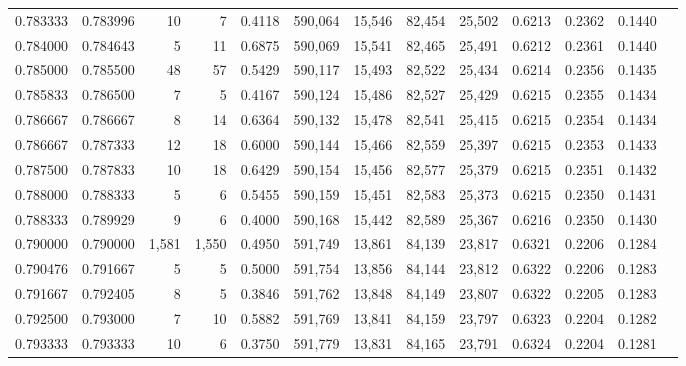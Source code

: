 \begin{tabular}{rrrrrrrrrrrrr}
0.783333 & 0.783996 &     10 &     7 &                                     0.4118 & 590,064 &  15,546 &  82,454 &  25,502 & 0.6213 & 0.2362 & 0.1440 \\
0.784000 & 0.784643 &      5 &    11 &                                     0.6875 & 590,069 &  15,541 &  82,465 &  25,491 & 0.6212 & 0.2361 & 0.1440 \\
0.785000 & 0.785500 &     48 &    57 &                                     0.5429 & 590,117 &  15,493 &  82,522 &  25,434 & 0.6214 & 0.2356 & 0.1435 \\
0.785833 & 0.786500 &      7 &     5 &                                     0.4167 & 590,124 &  15,486 &  82,527 &  25,429 & 0.6215 & 0.2355 & 0.1434 \\
0.786667 & 0.786667 &      8 &    14 &                                     0.6364 & 590,132 &  15,478 &  82,541 &  25,415 & 0.6215 & 0.2354 & 0.1434 \\
0.786667 & 0.787333 &     12 &    18 &                                     0.6000 & 590,144 &  15,466 &  82,559 &  25,397 & 0.6215 & 0.2353 & 0.1433 \\
0.787500 & 0.787833 &     10 &    18 &                                     0.6429 & 590,154 &  15,456 &  82,577 &  25,379 & 0.6215 & 0.2351 & 0.1432 \\
0.788000 & 0.788333 &      5 &     6 &                                     0.5455 & 590,159 &  15,451 &  82,583 &  25,373 & 0.6215 & 0.2350 & 0.1431 \\
0.788333 & 0.789929 &      9 &     6 &                                     0.4000 & 590,168 &  15,442 &  82,589 &  25,367 & 0.6216 & 0.2350 & 0.1430 \\
0.790000 & 0.790000 &  1,581 & 1,550 &                                     0.4950 & 591,749 &  13,861 &  84,139 &  23,817 & 0.6321 & 0.2206 & 0.1284 \\
0.790476 & 0.791667 &      5 &     5 &                                     0.5000 & 591,754 &  13,856 &  84,144 &  23,812 & 0.6322 & 0.2206 & 0.1283 \\
0.791667 & 0.792405 &      8 &     5 &                                     0.3846 & 591,762 &  13,848 &  84,149 &  23,807 & 0.6322 & 0.2205 & 0.1283 \\
0.792500 & 0.793000 &      7 &    10 &                                     0.5882 & 591,769 &  13,841 &  84,159 &  23,797 & 0.6323 & 0.2204 & 0.1282 \\
0.793333 & 0.793333 &     10 &     6 &                                     0.3750 & 591,779 &  13,831 &  84,165 &  23,791 & 0.6324 & 0.2204 & 0.1281 \\

\end{tabular}
